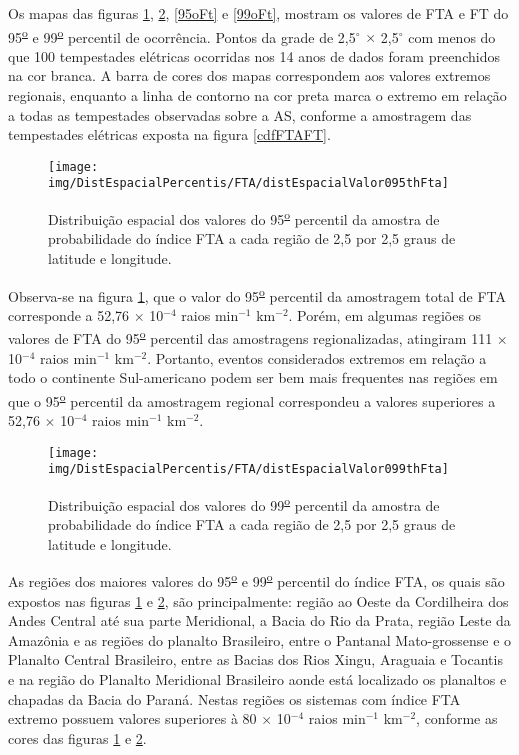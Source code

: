 Os mapas das figuras \ref{95oFta}, \ref{99oFta}, \ref{95oFt}  e \ref{99oFt}, mostram os valores de FTA e FT do 95\textsuperscript{\underline{o}} e 99\textsuperscript{\underline{o}} percentil de ocorrência. Pontos da grade de 2,5$^{\circ}$ $\times$ 2,5$^{\circ}$ com menos do que 100 tempestades elétricas ocorridas nos 14 anos de dados foram preenchidos na cor branca. A barra de cores dos mapas correspondem aos valores extremos regionais, enquanto a linha de contorno na cor preta marca o extremo em relação a todas as tempestades observadas sobre a AS, conforme a amostragem das tempestades elétricas exposta na figura \ref{cdfFTAFT}.

\begin{figure}[!ht]
\centering
{\texttt{[image: img/DistEspacialPercentis/FTA/distEspacialValor095thFta]}} 
\caption{Distribuição espacial dos valores do 95\textsuperscript{\underline{o}} percentil da amostra de probabilidade do índice FTA a cada região de 2,5 por 2,5 graus de latitude e longitude.}
\label{95oFta}
\end{figure}

Observa-se na figura \ref{95oFta}, que o valor do 95\textsuperscript{\underline{o}} percentil da amostragem total de FTA corresponde a 52,76 $\times$ 10$^{-4}$ raios min$^{-1}$
km$^{-2}$. Porém, em algumas regiões os valores de FTA do 95\textsuperscript{\underline{o}} percentil das amostragens regionalizadas, atingiram  111 $\times$ 10$^{-4}$ raios min$^{-1}$ km$^{-2}$. Portanto, eventos considerados extremos em relação a todo o continente Sul-americano podem ser bem mais frequentes nas regiões em que o 95\textsuperscript{\underline{o}} percentil da amostragem regional correspondeu a valores superiores a 52,76 $\times$ 10$^{-4}$ raios min$^{-1}$ km$^{-2}$.
  
\begin{figure}[!ht]
\centering  
{\texttt{[image: img/DistEspacialPercentis/FTA/distEspacialValor099thFta]}}
\caption{Distribuição espacial dos valores do  99\textsuperscript{\underline{o}} percentil da amostra de probabilidade do índice FTA a cada região de 2,5 por 2,5 graus de latitude e longitude.}
\label{99oFta}
\end{figure} 

As regiões dos maiores valores do 95\textsuperscript{\underline{o}} e 99\textsuperscript{\underline{o}} percentil do índice FTA, os quais são expostos nas figuras \ref{95oFta} e \ref{99oFta}, são principalmente:  região ao Oeste da Cordilheira dos Andes Central até sua parte Meridional, a Bacia do Rio da Prata, região Leste da Amazônia e as regiões do planalto Brasileiro, entre o Pantanal Mato-grossense e o Planalto Central Brasileiro, entre as Bacias dos Rios Xingu, Araguaia e Tocantis e na região do Planalto Meridional Brasileiro aonde está localizado os planaltos e chapadas da Bacia do Paraná. Nestas regiões os sistemas com índice FTA extremo possuem valores superiores à 80 $\times$ 10$^{-4}$ raios min$^{-1}$ km$^{-2}$, conforme as cores das figuras \ref{95oFta} e \ref{99oFta}. 

